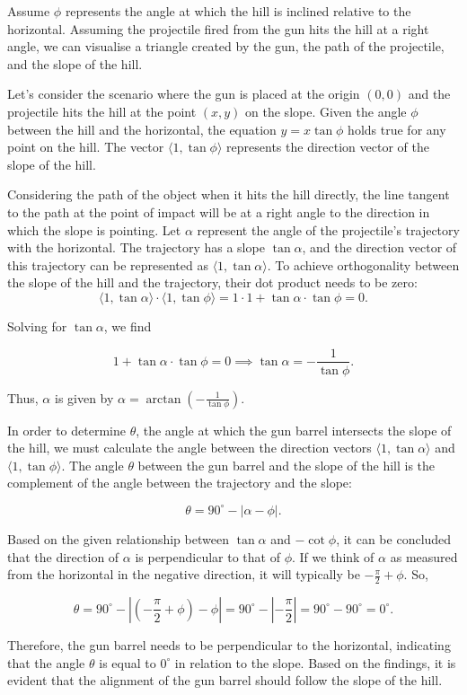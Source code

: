\begin{solution}{6.54}
Assume \(\phi\) represents the angle at which the hill is inclined relative to the horizontal. Assuming the projectile fired from the gun hits the hill at a right angle, we can visualise a triangle created by the gun, the path of the projectile, and the slope of the hill.

Let's consider the scenario where the gun is placed at the origin \((0,0)\) and the projectile hits the hill at the point \((x, y)\) on the slope. Given the angle \(\phi\) between the hill and the horizontal, the equation \(y = x \tan \phi\) holds true for any point on the hill. The vector \(\langle 1, \tan \phi \rangle\) represents the direction vector of the slope of the hill.

Considering the path of the object when it hits the hill directly, the line tangent to the path at the point of impact will be at a right angle to the direction in which the slope is pointing. Let \(\alpha\) represent the angle of the projectile's trajectory with the horizontal. The trajectory has a slope \(\tan \alpha\), and the direction vector of this trajectory can be represented as \(\langle 1, \tan \alpha \rangle\). To achieve orthogonality between the slope of the hill and the trajectory, their dot product needs to be zero:
\[
\langle 1, \tan \alpha \rangle \cdot \langle 1, \tan \phi \rangle = 1 \cdot 1 + \tan \alpha \cdot \tan \phi = 0.
\]

Solving for \(\tan \alpha\), we find

\[
1 + \tan \alpha \cdot \tan \phi = 0 \implies \tan \alpha = -\frac{1}{\tan \phi}.
\]

Thus, \(\alpha\) is given by \(\alpha = \arctan\left(-\frac{1}{\tan \phi}\right)\).

In order to determine \(\theta\), the angle at which the gun barrel intersects the slope of the hill, we must calculate the angle between the direction vectors \(\langle 1, \tan \alpha \rangle\) and \(\langle 1, \tan \phi \rangle\). The angle \(\theta\) between the gun barrel and the slope of the hill is the complement of the angle between the trajectory and the slope:

\[
\theta = 90^\circ - |\alpha - \phi|.
\]

Based on the given relationship between \(\tan \alpha\) and \(-\cot \phi\), it can be concluded that the direction of \(\alpha\) is perpendicular to that of \(\phi\). If we think of \(\alpha\) as measured from the horizontal in the negative direction, it will typically be \(-\frac{\pi}{2} + \phi\). So,

\[
\theta = 90^\circ - \left|\left(-\frac{\pi}{2} + \phi\right) - \phi\right| = 90^\circ - \left|-\frac{\pi}{2}\right| = 90^\circ - 90^\circ = 0^\circ.
\]

Therefore, the gun barrel needs to be perpendicular to the horizontal, indicating that the angle \(\theta\) is equal to \(0^\circ\) in relation to the slope. Based on the findings, it is evident that the alignment of the gun barrel should follow the slope of the hill.
\end{solution}

